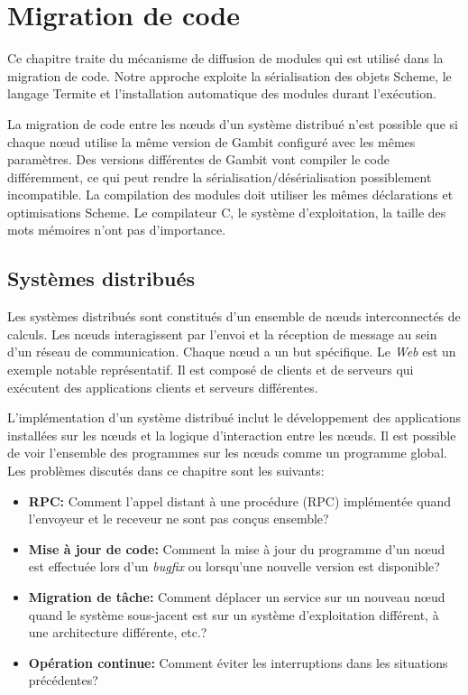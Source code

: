 \chapter{Migration de code}
\label{ch:task_migration}

Ce chapitre traite du mécanisme de diffusion de modules qui est utilisé dans
la migration de code. Notre approche exploite la sérialisation des objets
Scheme, le langage Termite et l'installation automatique des modules durant
l'exécution.

La migration de code entre les nœuds d'un système distribué n'est possible
que si chaque nœud utilise la même version de Gambit configuré avec les
mêmes paramètres. Des versions différentes de Gambit vont compiler le code
différemment, ce qui peut rendre la sérialisation/désérialisation possiblement
incompatible. La compilation des modules doit utiliser les mêmes déclarations
et optimisations Scheme. Le compilateur C, le système d'exploitation, la taille
des mots mémoires n'ont pas d'importance.

\section{Systèmes distribués}

Les systèmes distribués sont constitués d'un ensemble de nœuds interconnectés
de calculs. Les nœuds interagissent par l'envoi et la réception de message au
sein d'un réseau de communication. Chaque nœud a un but spécifique. Le
\textit{Web} est un exemple notable représentatif.  Il est composé de clients
et de serveurs qui exécutent des applications clients et serveurs différentes.

L'implémentation d'un système distribué inclut le développement des
applications installées sur les nœuds et la logique d'interaction entre les
nœuds. Il est possible de voir l'ensemble des programmes sur les nœuds comme un
programme global. Les problèmes discutés dans ce chapitre sont les suivants:

\begin{itemize}

  \item {\bf RPC:} Comment l'appel distant à une procédure (RPC)
    implémentée quand l'envoyeur et le receveur ne sont pas conçus
    ensemble?

  \item {\bf Mise à jour de code:} Comment la mise à jour du programme d'un
    nœud est effectuée lors d'un \textit{bugfix} ou lorsqu'une nouvelle
    version est disponible?

  \item {\bf Migration de tâche:} Comment déplacer un service sur un nouveau
    nœud quand le système sous-jacent est sur un système d'exploitation
    différent, à une architecture différente, etc.?

  \item {\bf Opération continue:} Comment éviter les interruptions dans les
    situations précédentes?

\end{itemize}

